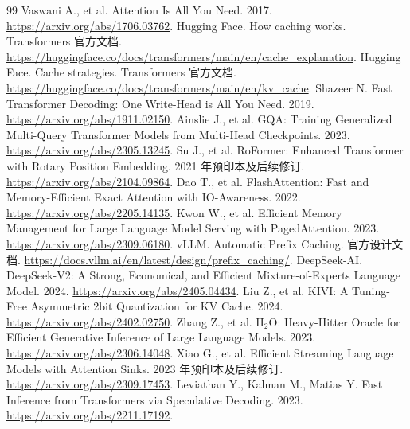 \documentclass[UTF8,12pt,a4paper,fontset=fandol]{ctexart}
\begin{document}
\begin{thebibliography}{99}
 Vaswani A., et al. Attention Is All You Need. 2017. \url{https://arxiv.org/abs/1706.03762}.
 Hugging Face. How caching works. Transformers 官方文档. \url{https://huggingface.co/docs/transformers/main/en/cache_explanation}.
 Hugging Face. Cache strategies. Transformers 官方文档. \url{https://huggingface.co/docs/transformers/main/en/kv_cache}.
 Shazeer N. Fast Transformer Decoding: One Write-Head is All You Need. 2019. \url{https://arxiv.org/abs/1911.02150}.
 Ainslie J., et al. GQA: Training Generalized Multi-Query Transformer Models from Multi-Head Checkpoints. 2023. \url{https://arxiv.org/abs/2305.13245}.
 Su J., et al. RoFormer: Enhanced Transformer with Rotary Position Embedding. 2021 年预印本及后续修订. \url{https://arxiv.org/abs/2104.09864}.
 Dao T., et al. FlashAttention: Fast and Memory-Efficient Exact Attention with IO-Awareness. 2022. \url{https://arxiv.org/abs/2205.14135}.
 Kwon W., et al. Efficient Memory Management for Large Language Model Serving with PagedAttention. 2023. \url{https://arxiv.org/abs/2309.06180}.
 vLLM. Automatic Prefix Caching. 官方设计文档. \url{https://docs.vllm.ai/en/latest/design/prefix_caching/}.
 DeepSeek-AI. DeepSeek-V2: A Strong, Economical, and Efficient Mixture-of-Experts Language Model. 2024. \url{https://arxiv.org/abs/2405.04434}.
 Liu Z., et al. KIVI: A Tuning-Free Asymmetric 2bit Quantization for KV Cache. 2024. \url{https://arxiv.org/abs/2402.02750}.
 Zhang Z., et al. H$_2$O: Heavy-Hitter Oracle for Efficient Generative Inference of Large Language Models. 2023. \url{https://arxiv.org/abs/2306.14048}.
 Xiao G., et al. Efficient Streaming Language Models with Attention Sinks. 2023 年预印本及后续修订. \url{https://arxiv.org/abs/2309.17453}.
 Leviathan Y., Kalman M., Matias Y. Fast Inference from Transformers via Speculative Decoding. 2023. \url{https://arxiv.org/abs/2211.17192}.
\end{thebibliography}
\end{document}
